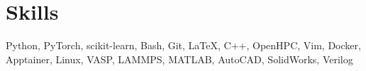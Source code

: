 \section{Skills}
Python, PyTorch, scikit-learn, Bash, Git, \LaTeX, C++, OpenHPC, Vim, Docker, Apptainer, Linux, VASP, LAMMPS, MATLAB, AutoCAD, SolidWorks, Verilog
